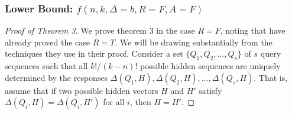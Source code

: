 \documentclass[12pt, a4paper]{article}
\begin{document}
\subsubsection{Lower Bound: $f(n, k, \Delta=b, R=F, A=F)$}


\begin{proof}[Proof of Theorem 3]
	We prove theorem 3 in the case $R = F$, noting that \cite{DS13} have already proved the case $R=T$. We will be drawing substantially from the techniques they use in their proof. Consider a set $\{Q_1, Q_2, \ldots, Q_s\}$ of $s$ query sequences such that all $k!/(k-n)!$ possible hidden sequences are uniquely determined by the responses $\Delta(Q_1, H), \Delta(Q_2, H), \ldots, \Delta(Q_s, H)$. That is, assume that if two possible hidden vectors $H$ and $H'$ satisfy $\Delta(Q_i, H) = \Delta(Q_i, H')$ for all $i$, then $H = H'$.


\end{proof}
\end{document}
